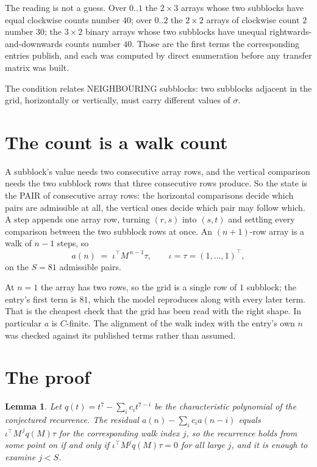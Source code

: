 \documentclass[11pt,a4paper]{article}
\theoremstyle{plain}
\newtheorem{lemma}[theorem]{Lemma}
\theoremstyle{definition}
\begin{document}
The reading is not a guess. Over $0..1$ the $2\times3$ arrays whose two subblocks have equal
clockwise counts number $40$; over $0..2$ the $2\times2$ arrays of clockwise count $2$ number
$30$; the $3\times2$ binary arrays whose two subblocks have unequal rightwards-and-downwards
counts number $40$. Those are the first terms the corresponding entries publish, and each was
computed by direct enumeration before any transfer matrix was built.

The condition relates NEIGHBOURING subblocks: two subblocks adjacent in the grid, horizontally
or vertically, must carry different values of $\sigma$.

\section{The count is a walk count}

A subblock's value needs two consecutive array rows, and the vertical
comparison needs the two subblock rows that three consecutive rows produce. So the state is the
PAIR of consecutive array rows: the horizontal comparisons decide which pairs are admissible at
all, the vertical ones decide which pair may follow which. A step appends one array row,
turning $(r,s)$ into $(s,t)$ and settling every comparison between the two subblock rows at
once. An $(n+1)$-row array is a walk of $n-1$ steps, so
\[
a(n)\;=\;\iota^{\!\top}M^{\,n-1}\tau,\qquad\iota=\tau=(1,\dots,1)^{\!\top},
\]
on the $S=81$ admissible pairs.

At $n=1$ the array has two rows, so the grid is a single row of $1$
subblock; the entry's first term is $81$, which the model
reproduces along with every later term. That is the cheapest check that the grid has been read
with the right shape.
In particular $a$ is $C$-finite. The alignment of the walk index with the entry's own $n$ was
checked against its published terms rather than assumed.

\section{The proof}

\begin{lemma}\label{lem:crit}
Let $q(t)=t^{7}-\sum_i c_it^{7-i}$ be the characteristic polynomial of the
conjectured recurrence. The residual $a(n)-\sum_ic_ia(n-i)$ equals
$\iota^{\!\top}M^{\,j}q(M)\tau$ for the corresponding walk index $j$, so the recurrence
holds from some point on if and only if $\iota^{\!\top}M^{j}q(M)\tau=0$ for all large $j$,
and it is enough to examine $j<S$.
\end{lemma}
\end{document}
